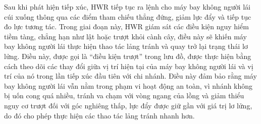 \documentclass[12pt,a4paper]{article}
\begin{document}
Sau khi phát hiện tiếp xúc, HWR tiếp tục ra lệnh cho máy bay không người lái cúi xuống thông qua các điểm tham chiếu thẳng đứng, giảm lực đẩy và tiếp tục đo lực tương tác. Trong giai đoạn này, HWR giám sát các điều kiện nguy hiểm tiềm tàng, chẳng hạn như lật hoặc trượt khỏi cành cây, điều này sẽ khiến máy bay không người lái thực hiện thao tác lảng tránh và quay trở lại trạng thái lơ lửng. Điều này, được gọi là “điều kiện trượt” trong lưu đồ, được thực hiện bằng cách theo dõi các thay đổi giữa vị trí hiện tại của máy bay không người lái và vị trí của nó trong lần tiếp xúc đầu tiên với chi nhánh. Điều này đảm bảo rằng máy bay không người lái vẫn nằm trong phạm vi hoạt động an toàn, vì nhánh không bị uốn cong quá nhiều, tránh va chạm với vòng ngang của lồng và giảm thiểu nguy cơ trượt đối với góc nghiêng thấp, lực đẩy được giữ gần với giá trị lơ lửng, do đó cho phép thực hiện các thao tác lảng tránh nhanh hơn.\\
\end{document}

